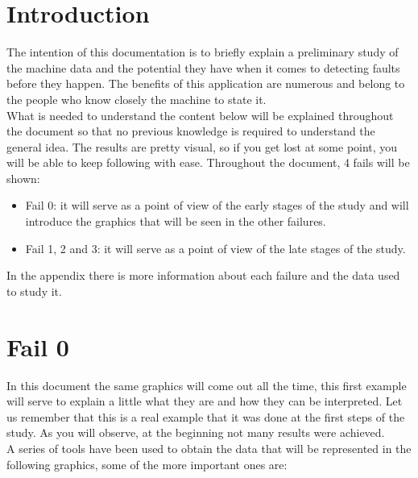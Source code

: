 \documentclass[
]{article}
\author{}
\date{}
\begin{document}
\hypertarget{introduction}{%
\section{Introduction}\label{introduction}}

The intention of this documentation is to briefly explain a preliminary
study of the machine data and the potential they have when it comes to
detecting faults before they happen. The benefits of this application
are numerous and belong to the people who know closely the machine to
state it.\\
What is needed to understand the content below will be explained
throughout the document so that no previous knowledge is required to
understand the general idea. The results are pretty visual, so if you
get lost at some point, you will be able to keep following with ease.
Throughout the document, 4 fails will be shown:

\begin{itemize}
\item
  Fail 0: it will serve as a point of view of the early stages of the
  study and will introduce the graphics that will be seen in the other
  failures.
\item
  Fail 1, 2 and 3: it will serve as a point of view of the late stages
  of the study.
\end{itemize}

In the appendix there is more information about each failure and the
data used to study it.

\hypertarget{fail-0}{%
\section{Fail 0}\label{fail-0}}

In this document the same graphics will come out all the time, this
first example will serve to explain a little what they are and how they
can be interpreted. Let us remember that this is a real example that it
was done at the first steps of the study. As you will observe, at the
beginning not many results were achieved.\\
A series of tools have been used to obtain the data that will be
represented in the following graphics, some of the more important ones
are:
\end{document}
